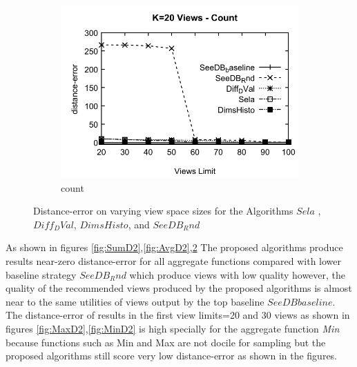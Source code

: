 \begin{figure}[h]
\begin{subfigure}[b]{0.32\textwidth}
    \includegraphics[width=\textwidth]{CountD2.pdf}
     \caption{count}
        \label{fig:CountD2}
  \end{subfigure}
  \caption{Distance-error on varying view space sizes for the Algorithms $Sela$ ,$Diff_DVal$, $DimsHisto$, and $SeeDB_Rnd$}
\end{figure}

As shown in figures \ref{fig:SumD2},\ref{fig:AvgD2},\ref{fig:CountD2} The proposed algorithms produce results near-zero distance-error for all aggregate functions compared with lower baseline strategy $SeeDB_Rnd$ which produce views with low quality however, the quality of the recommended views produced by the proposed algorithms is almost near to the same utilities of views output by the top baseline $SeeDB baseline$. The distance-error of results in the first view limits=20 and 30 views as shown in figures \ref{fig:MaxD2},\ref{fig:MinD2} is high specially for the aggregate function \emph{Min} because functions such as Min and Max are not docile for sampling but the proposed algorithms still score very low distance-error as shown in the figures.
 
